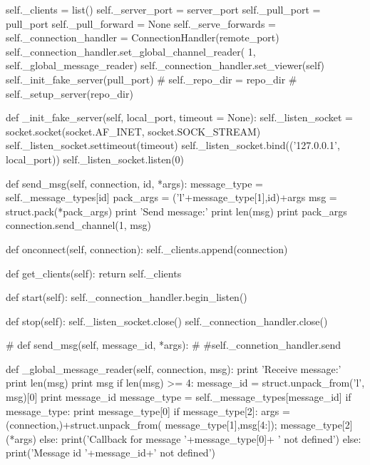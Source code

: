         self._clients     = list()
        self._server_port = server_port
        self._pull_port   = pull_port
        self._pull_forward = None
        self._serve_forwards = {}
        self._connection_handler = ConnectionHandler(remote_port)
        self._connection_handler.set_global_channel_reader(
            1, self._global_message_reader)
        self._connection_handler.set_viewer(self)
        self._init_fake_server(pull_port)
#        self._repo_dir = repo_dir
#        self._setup_server(repo_dir)

    def _init_fake_server(self, local_port, timeout = None):
        self._listen_socket = socket.socket(socket.AF_INET, socket.SOCK_STREAM)
        self._listen_socket.settimeout(timeout)
        self._listen_socket.bind(('127.0.0.1', local_port))
        self._listen_socket.listen(0)

    def send_msg(self, connection, id, *args):
        message_type = self._message_types[id]
        pack_args = ('l'+message_type[1],id)+args
        msg = struct.pack(*pack_args)
        print 'Send message:'
        print len(msg)
        print pack_args
        connection.send_channel(1, msg)

    def onconnect(self, connection):
        self._clients.append(connection)

    def get_clients(self):
        return self._clients

    def start(self):
        self._connection_handler.begin_listen()

    def stop(self):
        self._listen_socket.close()
        self._connection_handler.close()

#    def send_msg(self, message_id, *args):
#        #self._connetion_handler.send

    def _global_message_reader(self, connection, msg):
        print 'Receive message:'
        print len(msg)
        print msg
        if len(msg) >= 4:
            message_id = struct.unpack_from('l', msg)[0]
            print message_id
            message_type = self._message_types[message_id]
            if message_type:
                print message_type[0]
                if message_type[2]:
                    args = (connection,)+struct.unpack_from(
                        message_type[1],msg[4:]);
                    message_type[2](*args)
                else:
                    print('Callback for message '+message_type[0]+
                          ' not defined')
            else:
                print('Message id '+message_id+' not defined')

